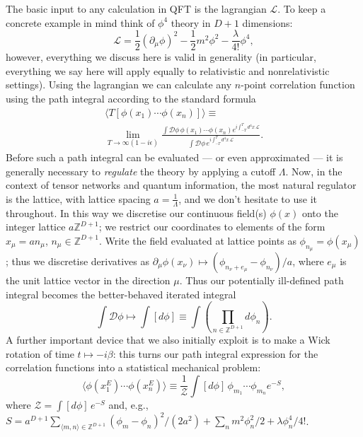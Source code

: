 \documentclass[prl,twocolumn,lengthcheck,superscriptaddress]{revtex4-1}
\theoremstyle{definition}
\theoremstyle{remark}
\begin{document}
The basic input to any calculation in QFT is the lagrangian $\mathcal{L}$. To keep a concrete example in mind think of $\phi^4$ theory in $D+1$ dimensions:
\begin{equation}
	\mathcal{L} = \frac12 (\partial_\mu\phi)^2 - \frac12m^2 \phi^2 -\frac{\lambda}{4!}\phi^4,
\end{equation}
however, everything we discuss here is valid in generality (in particular, everything we say here will apply equally to relativistic and nonrelativistic settings).  Using the lagrangian we can calculate any $n$-point correlation function using the path integral according to the standard formula
\begin{multline}	
	\langle  T[\phi(x_1)\cdots \phi(x_n)] \rangle\equiv\\ \lim_{T\rightarrow \infty(1-i\epsilon)} \frac{\int \mathcal{D}\phi \, \phi(x_1)\cdots \phi(x_n)e^{i\int_{-T}^T d^4x\, \mathcal{L}}}{\int \mathcal{D}\phi\, e^{i\int_{-T}^T d^4x\, \mathcal{L}}}.
\end{multline} 
Before such a path integral can be evaluated --- or even approximated --- it is generally necessary to \emph{regulate} the theory by applying a cutoff $\Lambda$. Now, in the context of tensor networks and quantum information, the most natural regulator is the lattice, with lattice spacing $a = \frac{1}{\Lambda}$, and we don't hesitate to use it throughout. In this way we discretise our continuous field(s) $\phi(x)$ onto the integer lattice $a\mathbb{Z}^{D+1}$; we restrict our coordinates to elements of the form $x_\mu = an_\mu$, $n_\mu \in \mathbb{Z}^{D+1}$. Write the field evaluated at lattice points as $\phi_{n_{\mu}} = \phi(x_\mu)$; thus we discretise derivatives as $\partial_\mu \phi(x_\nu) \mapsto (\phi_{n_\nu + e_{\mu}} - \phi_{n_\nu})/a$,   where $e_\mu$ is the unit lattice vector in the direction $\mu$. Thus our potentially ill-defined path integral becomes the better-behaved iterated integral
\begin{equation}\label{eq:wrcorr}
	\int \mathcal{D}\phi \mapsto \int [d\phi] \equiv \int \left(\prod_{n\in\mathbb{Z}^{D+1}} d\phi_n \right).
\end{equation}
A further important device that we also initially exploit is to make a Wick rotation of time $t\mapsto -i\beta$: this turns our path integral expression for the correlation functions into a statistical mechanical problem:
\begin{equation}	
	\langle  \phi(x_{1}^E)\cdots \phi(x_n^E) \rangle\equiv \frac{1}{\mathcal{Z}}\int [d\phi] \, \phi_{m_1}\cdots \phi_{m_n} e^{-S},
\end{equation} 
where $\mathcal{Z} = \int [d\phi] \, e^{-S}$ and, e.g., $S = a^{D+1}\sum_{\langle m,n\rangle\in \mathbb{Z}^{D+1}} (\phi_m-\phi_n)^2/(2a^2) + \sum_{n} m^2\phi_n^2/2 + \lambda \phi_n^4/4!$.
\end{document}
